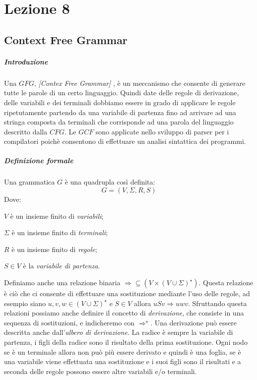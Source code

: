 
\section{Lezione 8}
\subsection{Context Free Grammar}
\subparagraph{Introduzione} Una $GFG$, \emph{[Contex Free Grammar]} , \`e un meccanismo che consente di generare tutte le parole di un certo linguaggio. Quindi date delle regole di derivazione, delle variabili e dei terminali dobbiamo essere in grado di applicare le regole ripetutamente partendo da una variabile di partenza fino ad arrivare ad una stringa composta da terminali che corrisponde ad una parola del linguaggio descritto dalla $CFG$.\newline
Le $GCF$ sono applicate nello sviluppo di parser per i compilatori poich\`e consentono di effettuare un analisi sintattica dei programmi.
\subparagraph{Definizione formale} Una grammatica $G$ \`e una quadrupla cos\`i definita:
\[
	G = (V, \Sigma, R, S)
\]
Dove:
\begin{description}
	\item $V$ \`e un insieme finito di \emph{variabili};
	\item $\Sigma$ \`e un insieme finito di \emph{terminali};
	\item $R$ \`e un insieme finito di \emph{regole};
	\item $S \in V$ \`e la \emph{variabile di partenza}.
\end{description}
Definiamo anche una relazione binaria $\Rightarrow \subseteq (V \times (V \cup \Sigma)^{\star})$. Questa relazione \`e ci\`o che ci consente di effettuare una sostituzione mediante l'uso delle regole, ad esempio siano $u, v, w \in (V \cup \Sigma)^{\star}$ e $S \in V$ allora $uSv \Rightarrow uwv$. \newline
Sfruttando questa relazioni possiamo anche definire il concetto di \emph{derivazione}, che consiste in una sequenza di sostituzioni, e indicheremo con $\Rightarrow^{\star}$.\newline
Una derivazione pu\`o essere descritta anche dall'\emph{albero di derivazione}. La radice \`e sempre la variabile di partenza, i figli della radice sono il risultato della prima sostituzione. Ogni nodo se \`e un terminale allora non pu\`o pi\`u essere derivato e quindi \`e una foglia, se \`e una variabile viene effettuata una sostituzione e i suoi figli sono il risultati e a seconda delle regole possono essere altre variabili e/o terminali.

